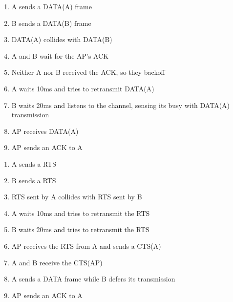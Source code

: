 \begin{solution}
    \begin{enumerate}
        \item A sends a DATA(A) frame
        \item B sends a DATA(B) frame
        \item DATA(A) collides with DATA(B)
        \item A and B wait for the AP's ACK
        \item Neither A nor B received the ACK, so they backoff
        \item A waits 10ms and tries to retransmit DATA(A)
        \item B waits 20ms and listens to the channel, sensing its busy with DATA(A) transmission
        \item AP receives DATA(A)
        \item AP sends an ACK to A
    \end{enumerate}
\end{solution}

\begin{solution}
    \begin{enumerate}
        \item A sends a RTS
        \item B sends a RTS
        \item RTS sent by A collides with RTS sent by B
        \item A waits 10ms and tries to retransmit the RTS
        \item B waits 20ms and tries to retransmit the RTS
        \item AP receives the RTS from A and sends a CTS(A)
        \item A and B receive the CTS(AP)
        \item A sends a DATA frame while B defers its transmission
        \item AP sends an ACK to A
    \end{enumerate}
\end{solution}

